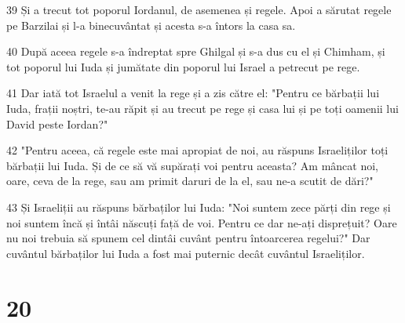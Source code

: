 \par 39 Și a trecut tot poporul Iordanul, de asemenea și regele. Apoi a sărutat regele pe Barzilai și l-a binecuvântat și acesta s-a întors la casa sa.
\par 40 După aceea regele s-a îndreptat spre Ghilgal și s-a dus cu el și Chimham, și tot poporul lui Iuda și jumătate din poporul lui Israel a petrecut pe rege.
\par 41 Dar iată tot Israelul a venit la rege și a zis către el: "Pentru ce bărbații lui Iuda, frații noștri, te-au răpit și au trecut pe rege și casa lui și pe toți oamenii lui David peste Iordan?"
\par 42 "Pentru aceea, că regele este mai apropiat de noi, au răspuns Israeliților toți bărbații lui Iuda. Și de ce să vă supărați voi pentru aceasta? Am mâncat noi, oare, ceva de la rege, sau am primit daruri de la el, sau ne-a scutit de dări?"
\par 43 Și Israeliții au răspuns bărbaților lui Iuda: "Noi suntem zece părți din rege și noi suntem încă și întâi născuți față de voi. Pentru ce dar ne-ați disprețuit? Oare nu noi trebuia să spunem cel dintâi cuvânt pentru întoarcerea regelui?" Dar cuvântul bărbaților lui Iuda a fost mai puternic decât cuvântul Israeliților.

\chapter{20}

